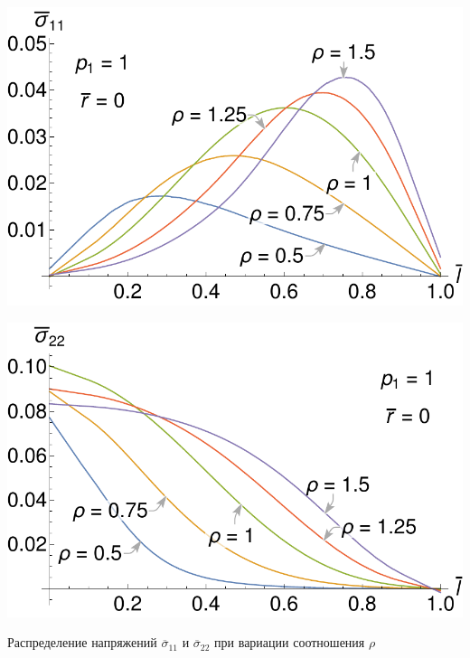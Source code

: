 \begin{frame}
\centering
\begin{minipage}{0.45\textwidth}
	\centering
	\includegraphics[width=\textwidth]{pics/ThermalKirshSigma11LocalPresentation.pdf} \\
\end{minipage}
\begin{minipage}{0.45\textwidth}
	\centering
	\includegraphics[width=\textwidth]{pics/ThermalKirshSigma22LocalPresentation.pdf} \\
\end{minipage}

Распределение напряжений $\overline{\sigma}_{11}$ и $\overline{\sigma}_{22}$ при вариации соотношения $\rho$

\bigskip
\bigskip


\end{frame}
